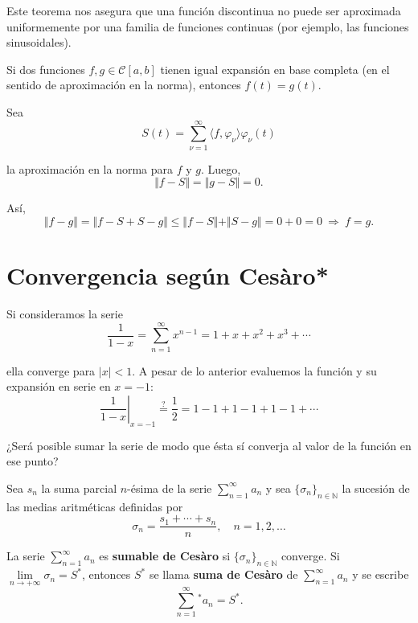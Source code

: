 Este teorema nos asegura que una función discontinua no puede ser aproximada uniformemente por una familia de funciones continuas (por ejemplo, las funciones sinusoidales).

\begin{teorema}
Si dos funciones $f,g \in \mathcal{C}[a,b]$ tienen igual expansión en base completa (en el sentido de aproximación en la norma), entonces $f(t) = g(t)$.
\end{teorema}

\begin{demo}
Sea
$$S(t) = \sum_{\nu = 1}^{\infty} \langle f, \varphi_{\nu}\rangle \varphi_{\nu}(t)$$

la aproximación en la norma para $f$ y $g$. Luego, 
$$\Vert f-S \Vert = \Vert g-S \Vert = 0.$$

Así, 
\begin{equation*}
    \Vert f-g \Vert = \Vert f-S+S-g \Vert \leq \Vert f-S \Vert + \Vert S-g \Vert = 0 +0 = 0 ~\Rightarrow~ f = g.
\end{equation*}

\end{demo}

\section{Convergencia según Cesàro*}

Si consideramos la serie
$$\frac{1}{1-x} = \sum_{n=1}^{\infty} x^{n-1} = 1 + x + x^2 + x^3 + \cdots$$

ella converge para $|x|< 1$. A pesar de lo anterior evaluemos la función y su expansión en serie en $x = -1$:
$$\left. \frac{1}{1-x} \right|_{x= -1} \overset{?}{=} \frac{1}{2} = 1 - 1 + 1 -1 +1 -1 + \cdots$$

¿Será posible sumar la serie de modo que ésta sí converja al valor de la función en ese punto?

\begin{defi}
Sea $s_n$ la suma parcial $n$-ésima de la serie $\sum\limits_{n=1}^{\infty} a_n$ y sea $\{\sigma_n\}_{n\in \mathbb{N}}$ la sucesión de las medias aritméticas definidas por
$$\sigma_n = \frac{s_1 + \cdots + s_n}{n}, \quad n = 1, 2, \dots$$

La serie $\sum\limits_{n=1}^{\infty} a_n$ es \textbf{sumable de Cesàro} si $\{\sigma_n\}_{n\in \mathbb{N}}$ converge. Si $\lim\limits_{n \to + \infty} \sigma_n = S^*$, entonces $S^*$ se llama \textbf{suma de Cesàro} de $\sum\limits_{n=1}^{\infty} a_n$ y se escribe 
$$ \sum_{n=1}^{\infty} ^*   a_n = S^*.$$
\end{defi}

